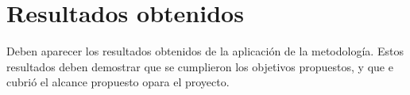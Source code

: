 \chapter{Resultados obtenidos}

Deben aparecer los resultados obtenidos de la aplicación de la metodología.
Estos resultados deben demostrar que se cumplieron los objetivos propuestos, 
y que e cubrió el alcance propuesto opara el proyecto.

